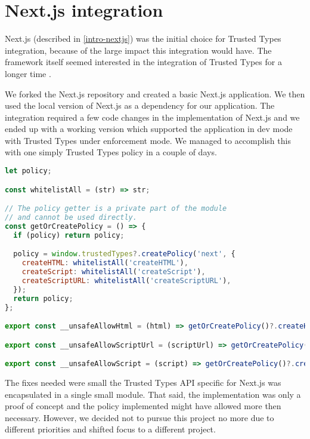 \section{Next.js integration}

Next.js (described in \ref{intro-nextjs}) was the initial choice for Trusted Types integration,
because of the large impact this integration would have. The framework itself seemed interested in
the integration of Trusted Types for a longer time \cite{nextjs_tt_pr_2020}.

We forked the Next.js repository and created a basic Next.js application. We then used the local
version of Next.js as a dependency for our application. The integration required a few code changes
in the implementation of Next.js and we ended up with a working version which supported the
application in dev mode with Trusted Types under enforcement mode. We managed to accomplish this
with one simply Trusted Types policy in a couple of days.

\bigskip
\begin{lstlisting}[language=JavaScript, caption=Example of Next.js Trusted Types API]
let policy;

const whitelistAll = (str) => str;

// The policy getter is a private part of the module
// and cannot be used directly.
const getOrCreatePolicy = () => {
  if (policy) return policy;

  policy = window.trustedTypes?.createPolicy('next', {
    createHTML: whitelistAll('createHTML'),
    createScript: whitelistAll('createScript'),
    createScriptURL: whitelistAll('createScriptURL'),
  });
  return policy;
};

export const __unsafeAllowHtml = (html) => getOrCreatePolicy()?.createHTML(html) ?? html;

export const __unsafeAllowScriptUrl = (scriptUrl) => getOrCreatePolicy()?.createScriptURL(scriptUrl) ?? scriptUrl;

export const __unsafeAllowScript = (script) => getOrCreatePolicy()?.createScript(script) ?? script;
\end{lstlisting}

The fixes needed were small the Trusted Types API specific for Next.js was encapsulated in a single
small module. That said, the implementation was only a proof of concept and the policy implemented
might have allowed more then necessary. However, we decided not to pursue this project no more due
to different priorities and shifted focus to a different project.

